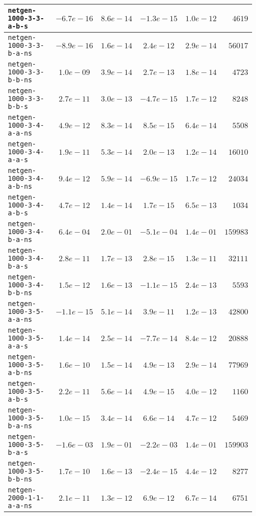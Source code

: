 \begin{center}
\begin{longtable}{|l || c | c | c | c | r|}
\hline
\texttt{netgen-1000-3-3-a-b-s} & $-6.7e-16$ & $8.6e-14$ & $-1.3e-15$ & $1.0e-12$ & $4619$ \\
\hline
\texttt{netgen-1000-3-3-b-a-ns} & $-8.9e-16$ & $1.6e-14$ & $2.4e-12$ & $2.9e-14$ & $56017$ \\
\hline
\texttt{netgen-1000-3-3-b-b-ns} & $1.0e-09$ & $3.9e-14$ & $2.7e-13$ & $1.8e-14$ & $4723$ \\
\hline
\texttt{netgen-1000-3-3-b-b-s} & $2.7e-11$ & $3.0e-13$ & $-4.7e-15$ & $1.7e-12$ & $8248$ \\
\hline
\texttt{netgen-1000-3-4-a-a-ns} & $4.9e-12$ & $8.3e-14$ & $8.5e-15$ & $6.4e-14$ & $5508$ \\
\hline
\texttt{netgen-1000-3-4-a-a-s} & $1.9e-11$ & $5.3e-14$ & $2.0e-13$ & $1.2e-14$ & $16010$ \\
\hline
\texttt{netgen-1000-3-4-a-b-ns} & $9.4e-12$ & $5.9e-14$ & $-6.9e-15$ & $1.7e-12$ & $24034$ \\
\hline
\texttt{netgen-1000-3-4-a-b-s} & $4.7e-12$ & $1.4e-14$ & $1.7e-15$ & $6.5e-13$ & $1034$ \\
\hline
\texttt{netgen-1000-3-4-b-a-ns} & $6.4e-04$ & $2.0e-01$ & $-5.1e-04$ & $1.4e-01$ & $159983$ \\
\hline
\texttt{netgen-1000-3-4-b-a-s} & $2.8e-11$ & $1.7e-13$ & $2.8e-15$ & $1.3e-11$ & $32111$ \\
\hline
\texttt{netgen-1000-3-4-b-b-ns} & $1.5e-12$ & $1.6e-13$ & $-1.1e-15$ & $2.4e-13$ & $5593$ \\
\hline
\texttt{netgen-1000-3-5-a-a-ns} & $-1.1e-15$ & $5.1e-14$ & $3.9e-11$ & $1.2e-13$ & $42800$ \\
\hline
\texttt{netgen-1000-3-5-a-a-s} & $1.4e-14$ & $2.5e-14$ & $-7.7e-14$ & $8.4e-12$ & $20888$ \\
\hline
\texttt{netgen-1000-3-5-a-b-ns} & $1.6e-10$ & $1.5e-14$ & $4.9e-13$ & $2.9e-14$ & $77969$ \\
\hline
\texttt{netgen-1000-3-5-a-b-s} & $2.2e-11$ & $5.6e-14$ & $4.9e-15$ & $4.0e-12$ & $1160$ \\
\hline
\texttt{netgen-1000-3-5-b-a-ns} & $1.0e-15$ & $3.4e-14$ & $6.6e-14$ & $4.7e-12$ & $5469$ \\
\hline
\texttt{netgen-1000-3-5-b-a-s} & $-1.6e-03$ & $1.9e-01$ & $-2.2e-03$ & $1.4e-01$ & $159903$ \\
\hline
\texttt{netgen-1000-3-5-b-b-ns} & $1.7e-10$ & $1.6e-13$ & $-2.4e-15$ & $4.4e-12$ & $8277$ \\
\hline
\texttt{netgen-2000-1-1-a-a-ns} & $2.1e-11$ & $1.3e-12$ & $6.9e-12$ & $6.7e-14$ & $6751$ \\

\end{longtable}
\end{center}
